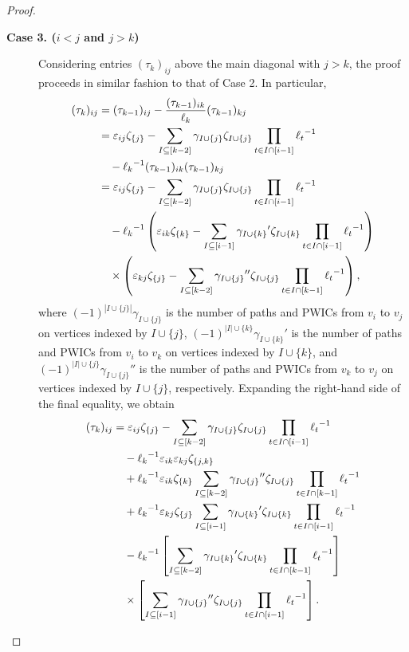 \documentclass{article}
\theoremstyle{definition}
\numberwithin{equation}{section}
\begin{document}
\begin{proof}
\begin{description}
\end{description}

\begin{description}
\item [{\bf Case 3. ($i<j$ and $j>k$)}]

Considering entries $(\tau_k)_{ij}$ above the main diagonal with $j>k$,  the proof proceeds in similar fashion to that of Case 2.   In particular, 
 \begin{align*}
(\tau_k)_{ij}&=(\tau_{k-1})_{ij}-\frac{(\tau_{k-1})_{ik}}{\ell_k}(\tau_{k-1})_{kj}\\
&=\varepsilon_{ij}\zeta_{\{j\}}-\sum_{I\subseteq [k-2]}\gamma_{I\cup\{j\}}\zeta_{I\cup\{j\}}\prod_{t\in I\cap[i-1]}{\ell_t}^{-1}\\
&\hskip10pt-{\ell_k}^{-1}(\tau_{k-1})_{ik}(\tau_{k-1})_{kj}\\
&=\varepsilon_{ij}\zeta_{\{j\}}-\sum_{I\subseteq [k-2]}\gamma_{I\cup\{j\}}\zeta_{I\cup\{j\}}\prod_{t\in I\cap[i-1]}{\ell_t}^{-1}\\
&\hskip10pt-{\ell_k}^{-1}\left(\varepsilon_{ik}\zeta_{\{k\}}-\sum_{I\subseteq [i-1]}{\gamma_{I\cup\{k\}}}'\zeta_{I\cup\{k\}}\prod_{t\in I\cap[i-1]}{\ell_t}^{-1}\right)\\
&\hskip10pt\times\left(\varepsilon_{kj}\zeta_{\{j\}}-\sum_{I\subseteq [k-2]}{\gamma_{I\cup\{j\}}}''\zeta_{I\cup\{j\}}\prod_{t\in I\cap[k-1]}{\ell_t}^{-1}\right),
\end{align*}
where $(-1)^{|I\cup\{j\}|}\gamma_{I\cup\{j\}}$ is the number of paths and PWICs from $v_i$ to $v_j$ on vertices indexed by $I\cup\{j\}$, $(-1)^{|I|\cup\{k\}}{\gamma_{I\cup\{k\}}}'$ is the number of paths and PWICs from $v_i$ to $v_k$ on vertices indexed by $I\cup\{k\}$, and $(-1)^{|I|\cup\{j\}}{\gamma_{I\cup\{j\}}}''$ is the number of paths and PWICs from $v_k$ to $v_j$ on vertices indexed by $I\cup\{j\}$, respectively.
Expanding the right-hand side of the final equality, we obtain 
\begin{align*}
(\tau_k)_{ij}&=\varepsilon_{ij}\zeta_{\{j\}}-\sum_{I\subseteq [k-2]}\gamma_{I\cup\{j\}}\zeta_{I\cup\{j\}}\prod_{t\in I\cap[i-1]}{\ell_t}^{-1}\\
&\hskip10pt-{\ell_k}^{-1}\varepsilon_{ik}\varepsilon_{kj}\zeta_{\{j,k\}}\\
&\hskip10pt+{\ell_k}^{-1}\varepsilon_{ik}\zeta_{\{k\}}\sum_{I\subseteq [k-2]}{\gamma_{I\cup\{j\}}}''\zeta_{I\cup\{j\}}\prod_{t\in I\cap[k-1]}{\ell_t}^{-1}\\
&\hskip10pt+{\ell_k}^{-1}\varepsilon_{kj}\zeta_{\{j\}}\sum_{I\subseteq [i-1]}{\gamma_{I\cup\{k\}}}'\zeta_{I\cup\{k\}}\prod_{t\in I\cap[i-1]}{\ell_t}^{-1}\\
&\hskip10pt-{\ell_k}^{-1}\left[\sum_{I\subseteq [k-2]}{\gamma_{I\cup\{k\}}}'\zeta_{I\cup\{k\}}\prod_{t\in I\cap[k-1]}{\ell_t}^{-1}\right]\\
&\hskip10pt\times\left[\sum_{I\subseteq [i-1]}{\gamma_{I\cup\{j\}}}''\zeta_{I\cup\{j\}}\prod_{t\in I\cap[i-1]}{\ell_t}^{-1}\right].
\end{align*}



\end{description}
\end{proof}
\end{document}
